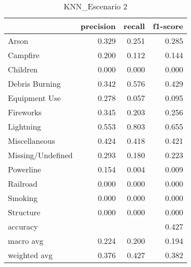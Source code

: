 \begin{table}
\centering
\caption{KNN_Escenario 2}
\label{tab:Reporte de clasificación para el Escenario 2 utilizando KNN}
\begin{tabular}{lrrr}
\toprule
{} &  precision &  recall &  f1-score \\
\midrule
Arson             &      0.329 &   0.251 &     0.285 \\
Campfire          &      0.200 &   0.112 &     0.144 \\
Children          &      0.000 &   0.000 &     0.000 \\
Debris Burning    &      0.342 &   0.576 &     0.429 \\
Equipment Use     &      0.278 &   0.057 &     0.095 \\
Fireworks         &      0.345 &   0.203 &     0.256 \\
Lightning         &      0.553 &   0.803 &     0.655 \\
Miscellaneous     &      0.424 &   0.418 &     0.421 \\
Missing/Undefined &      0.293 &   0.180 &     0.223 \\
Powerline         &      0.154 &   0.004 &     0.009 \\
Railroad          &      0.000 &   0.000 &     0.000 \\
Smoking           &      0.000 &   0.000 &     0.000 \\
Structure         &      0.000 &   0.000 &     0.000 \\
accuracy          &            &         &     0.427 \\
macro avg         &      0.224 &   0.200 &     0.194 \\
weighted avg      &      0.376 &   0.427 &     0.382 \\
\bottomrule
\end{tabular}
\end{table}
